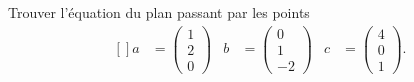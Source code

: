
\begin{exercice}\label{exoOutilsMath-0074}

    Trouver l'équation du plan passant par les points
    \begin{equation}
        \begin{aligned}[]
            a&=\begin{pmatrix}
                1    \\ 
                2    \\ 
                0    
            \end{pmatrix}&
            b&=\begin{pmatrix}
                0    \\ 
                1    \\ 
                -2    
            \end{pmatrix}&
            c&=\begin{pmatrix}
                4    \\ 
                0    \\ 
                1    
            \end{pmatrix}.
        \end{aligned}
    \end{equation}

\end{exercice}
